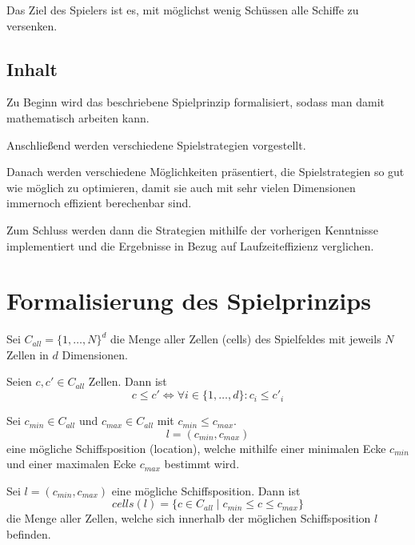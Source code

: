 \documentclass[a4paper,12pt]{llncs}
\numberwithin{equation}{section}
\newcommand{\bildbreite}[5]{
  \begin{figure}[htbp]
    \begin{center}
      \texttt{[image: \#1]}
      \caption[#5]{#4}
      \label{#3}
    \end{center}
  \end{figure}
}
\begin{document}
Das Ziel des Spielers ist es, mit möglichst wenig Schüssen alle Schiffe zu versenken.


\subsection{Inhalt}
Zu Beginn wird das beschriebene Spielprinzip formalisiert, sodass man damit mathematisch arbeiten kann.

Anschließend werden verschiedene Spielstrategien vorgestellt.

Danach werden verschiedene Möglichkeiten präsentiert, die Spielstrategien so gut wie möglich zu optimieren, damit sie auch mit sehr vielen Dimensionen immernoch effizient berechenbar sind.

Zum Schluss werden dann die Strategien mithilfe der vorherigen Kenntnisse implementiert und die Ergebnisse in Bezug auf Laufzeiteffizienz verglichen.

\section{Formalisierung des Spielprinzips}

\begin{definition}
Sei $C_{all}=\{1, \dots, N\}^d$ die Menge aller Zellen (cells) des Spielfeldes mit jeweils $N$ Zellen in $d$ Dimensionen.
\end{definition}

\begin{definition}
Seien $c, c' \in C_{all}$ Zellen.
Dann ist
\[
c \leq c' \Leftrightarrow \forall i \in \{1, \dots, d\} \colon c_{i} \leq c'_{i} 
\]
\end{definition}

\begin{definition}
Sei $c_{min} \in C_{all}$ und $c_{max} \in C_{all}$ mit $c_{min} \leq c_{max}$.
\[
l=(c_{min}, c_{max})
\]
eine mögliche Schiffsposition (location), welche mithilfe einer minimalen Ecke $c_{min}$ und einer maximalen Ecke $c_{max}$ bestimmt wird.
\end{definition}

\begin{definition}
Sei $l=(c_{min}, c_{max})$ eine mögliche Schiffsposition.
Dann ist
\[
cells(l)=
\{
c
\in
C_{all}
\mid
c_{min} \leq c \leq c_{max}
\}
\]
die Menge aller Zellen, welche sich innerhalb der möglichen Schiffsposition $l$ befinden.
\end{definition}
\end{document}
